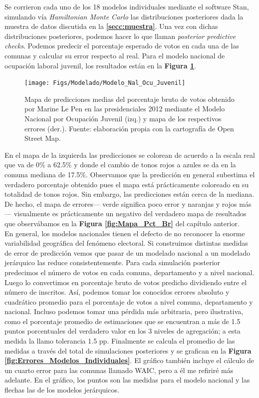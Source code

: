 Se corrieron cada uno de los 18 modelos individuales mediante el software Stan, simulando vía \textit{Hamiltonian Monte Carlo} las distribuciones posteriores dada la muestra de datos discutida en la \textbf{\autoref{secc:muestra}}. Una vez con dichas distribuciones posteriores, podemos hacer lo que \textcite{Gelman13} llaman \textit{posterior predictive checks}. Podemos predecir el porcentaje esperado de votos en cada una de las comunas y calcular su error respecto al real. Para el modelo nacional de ocupación laboral juvenil, los resultados están en la \textbf{Figura \ref{fig:Modelo_Nal_Ocu_Juvenil}}.\\

\begin{figure}[h]
	\centering
	\texttt{[image: Figs/Modelado/Modelo\_Nal\_Ocu\_Juvenil]}
	\caption{Mapa de predicciones medias del porcentaje bruto de votos obtenido por Marine Le Pen en las presidenciales 2012 mediante el Modelo Nacional por Ocupación Juvenil (izq.) y mapa de los respectivos errores (der.). Fuente: elaboración propia con la cartografía de Open Street Map.}
	\label{fig:Modelo_Nal_Ocu_Juvenil}
\end{figure}

En el mapa de la izquierda las predicciones se colorean de acuerdo a la escala real que va de 0\% a 62.5\% y donde el cambio de tonos rojos a azules se da en la comuna mediana de 17.5\%. Observamos que la predicción en general subestima el verdadero porcentaje obtenido pues el mapa está prácticamente coloreado en su totalidad de tonos rojos. Sin embargo, las predicciones están cerca de la mediana. De hecho, el mapa de errores--- verde significa poco error y naranjas y rojos más--- visualmente es prácticamente un negativo del verdadero mapa de resultados que observábamos en la \textbf{Figura \ref{fig:Mapa_Pct_Br}} del capítulo anterior.\\

En general, los modelos nacionales tienen el defecto de no reconocer la enorme variabilidad geográfica del fenómeno electoral. Si construimos distintas medidas de error de predicción vemos que pasar de un modelado nacional a un modelado jerárquico las reduce consistentemente. Para cada simulación posterior predecimos el número de votos en cada comuna, departamento y a nivel nacional. Luego lo convertimos en porcentaje bruto de votos predicho dividiendo entre el número de inscritos. Así, podemos tomar los conocidos errores absoluto y cuadrático promedio para el porcentaje de votos a nivel comuna, departamento y nacional. Incluso podemos tomar una pérdida más arbitraria, pero ilustrativa, como el porcentaje promedio de estimaciones que se encuentran a más de 1.5 puntos porcentuales del verdadero valor en los 3 niveles de agregación; a esta medida la llamo tolerancia 1.5 pp. Finalmente se calcula el promedio de las medidas a través del total de simulaciones posteriores y se grafican en la \textbf{Figura \ref{fig:Errores_Modelos_Individuales}}. El gráfico también incluye el cálculo de un cuarto error para las comunas llamado WAIC, pero a él me refiriré más adelante. En el gráfico, los puntos son las medidas para el modelo nacional y las flechas las de los modelos jerárquicos.\\ 

